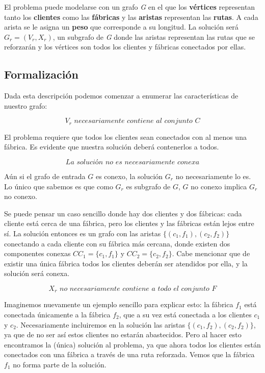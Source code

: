 \documentclass[a4paper]{report}
\begin{document}
El problema puede modelarse con un grafo \textit{G} en el que los \textbf{vértices} representan tanto los \textbf{clientes} como las \textbf{fábricas} y las \textbf{aristas} representan las \textbf{rutas}. A cada arista se le asigna un \textbf{peso} que corresponde a su longitud. La solución será $G_r = (V_r, X_r)$, un subgrafo de \textit{G} donde las aristas representan las rutas que se reforzarán y los vértices son todos los clientes y fábricas conectados por ellas.

\subsection{Formalización}

Dada esta descripción podemos comenzar a enumerar las características de nuestro grafo:

\begin{equation} 
    V_r \textit{ necesariamente contiene al conjunto } C
\end{equation}

El problema requiere que todos los clientes sean conectados con al menos una fábrica. Es evidente que nuestra solución deberá contenerlos a todos.

\begin{equation} 
    \textit{La solución no es necesariamente conexa}
\end{equation}

Aún si el grafo de entrada $G$ es conexo, la solución $G_r$ no necesariamente lo es. Lo único que sabemos es que como $G_r$ es subgrafo de $G$, $G$ no conexo implica $G_r$ no conexo.

Se puede pensar un caso sencillo donde hay dos clientes y dos fábricas: cada cliente está cerca de una fábrica, pero los clientes y las fábricas están lejos entre sí. La solución entonces es un grafo con las aristas $\{(c_1, f_1), (c_2, f_2)\}$ conectando a cada cliente con su fábrica más cercana, donde existen dos componentes conexas $CC_1 = \{c_1, f_1\}$ y $CC_2 = \{c_2, f_2\}$. Cabe mencionar que de existir una única fábrica todos los clientes deberán ser atendidos por ella, y la solución será conexa.

\begin{equation} 
    X_r \textit{ no necesariamente contiene a todo el conjunto } F
\end{equation}

Imaginemos nuevamente un ejemplo sencillo para explicar esto: la fábrica $f_1$ está conectada únicamente a la fábrica $f_2$, que a su vez está conectada a los clientes $c_1$ y $c_2$. Necesariamente incluiremos en la solución las aristas $\{(c_1, f_2), (c_2, f_2)\}$, ya que de no ser así estos clientes no estarán abastecidos. Pero al hacer esto encontramos la (única) solución al problema, ya que ahora todos los clientes están conectados con una fábrica a través de una ruta reforzada. Vemos que la fábrica $f_1$ no forma parte de la solución.
\end{document}
